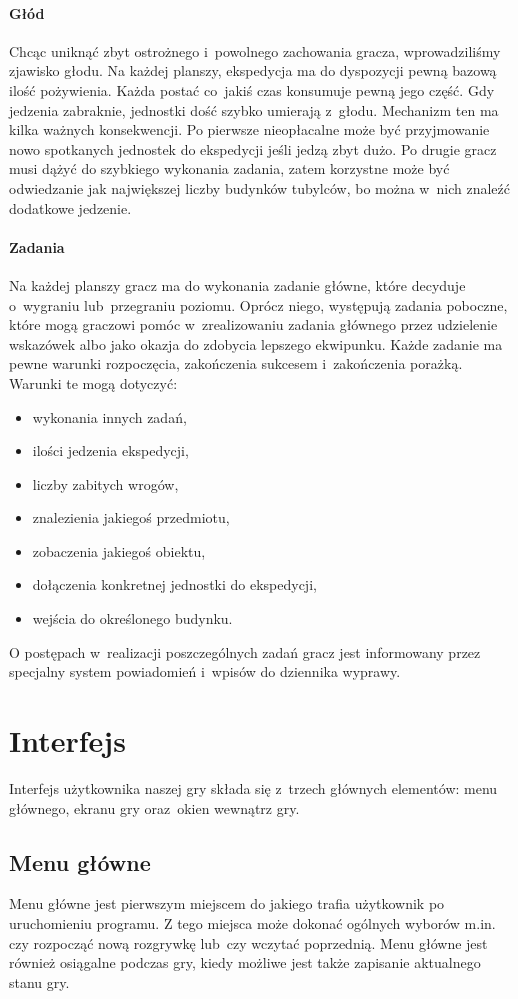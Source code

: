 \documentclass[licencjacka]{pracamgr}
\begin{document}
      \paragraph{Głód}
	Chcąc uniknąć zbyt ostrożnego i~powolnego zachowania gracza, wprowadziliśmy zjawisko głodu. Na każdej planszy, ekspedycja ma do dyspozycji pewną
	bazową ilość pożywienia. Każda postać co~jakiś czas konsumuje pewną jego część. Gdy jedzenia zabraknie, jednostki dość szybko
	umierają z~głodu. Mechanizm ten ma kilka ważnych konsekwencji. Po pierwsze nieopłacalne może być przyjmowanie nowo spotkanych jednostek do ekspedycji
	jeśli jedzą zbyt dużo. Po drugie gracz musi dążyć do szybkiego wykonania zadania, zatem korzystne może być odwiedzanie jak największej liczby budynków
	tubylców, bo można w~nich znaleźć dodatkowe jedzenie.
      \paragraph{Zadania}
	Na każdej planszy gracz ma do wykonania zadanie główne, które decyduje o~wygraniu lub~przegraniu poziomu. Oprócz niego,
	występują zadania poboczne, które mogą graczowi pomóc w~zrealizowaniu zadania głównego przez udzielenie wskazówek albo jako okazja do zdobycia lepszego
	ekwipunku. Każde zadanie ma pewne warunki rozpoczęcia, zakończenia sukcesem i~zakończenia porażką. Warunki te mogą dotyczyć:
	\begin{itemize}
	 \item wykonania innych zadań,
	 \item ilości jedzenia ekspedycji,
	 \item liczby zabitych wrogów,
	 \item znalezienia jakiegoś przedmiotu,
	 \item zobaczenia jakiegoś obiektu,
	 \item dołączenia konkretnej jednostki do ekspedycji,
	 \item wejścia do określonego budynku.
	\end{itemize}
	O postępach w~realizacji poszczególnych zadań gracz jest informowany przez specjalny system powiadomień i~wpisów do dziennika wyprawy.


  \section{Interfejs}
    Interfejs użytkownika naszej gry składa się z~trzech głównych elementów: menu głównego, ekranu gry oraz~okien wewnątrz gry.

    \subsection{Menu główne}
      Menu główne jest pierwszym miejscem do jakiego trafia użytkownik po uruchomieniu programu. Z tego miejsca może dokonać ogólnych wyborów m.in. czy
      rozpocząć nową rozgrywkę lub~czy wczytać poprzednią. Menu główne jest również osiągalne podczas gry, kiedy możliwe jest także zapisanie aktualnego stanu gry.
\end{document}
